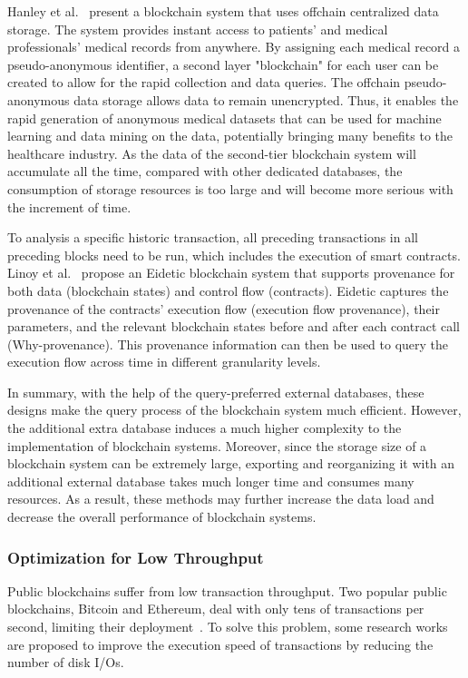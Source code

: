 \documentclass[acmsmall]{acmart}
\begin{document}
Hanley et al.~\cite{hanley2018managing} present a blockchain system that uses offchain centralized data storage. The system provides instant access to patients' and medical professionals' medical records from anywhere. By assigning each medical record a pseudo-anonymous identifier, a second layer "blockchain" for each user can be created to allow for the rapid collection and data queries. The offchain pseudo-anonymous data storage allows data to remain unencrypted. Thus, it enables the rapid generation of anonymous medical datasets that can be used for machine learning and data mining on the data, potentially bringing many benefits to the healthcare industry.
As the data of the second-tier blockchain system will accumulate all the time, compared with other dedicated databases, the consumption of storage resources is too large and will become more serious with the increment of time.



To analysis a specific historic transaction, all preceding transactions in all preceding blocks need to be run, which includes the execution of smart contracts. Linoy et al.~\cite{DBLP:conf/icde/LinoyRS20} propose an Eidetic blockchain system that supports provenance for both data (blockchain states) and control flow (contracts). Eidetic captures the provenance of the contracts’ execution flow (execution flow provenance), their parameters, and the relevant blockchain states before and after each contract call (Why-provenance). This provenance information can then be used to query the execution flow across time in different granularity levels.


In summary, with the help of the query-preferred external databases, these designs make the query process of the blockchain system much efficient. However, the additional extra database induces a much higher complexity to the implementation of blockchain systems. Moreover, since the storage size of a blockchain system can be extremely large, exporting and reorganizing it with an additional external database takes much longer time and consumes many resources. As a result, these methods may further increase the data load and decrease the overall performance of blockchain systems.


\subsubsection{ Optimization for Low Throughput} Public blockchains suffer from low transaction throughput. Two popular public blockchains, Bitcoin and Ethereum, deal with only tens of transactions per second, limiting their deployment~\cite{eth}. To solve this problem, some research works are proposed to improve the execution speed of transactions by reducing the number of disk I/Os.
\end{document}
